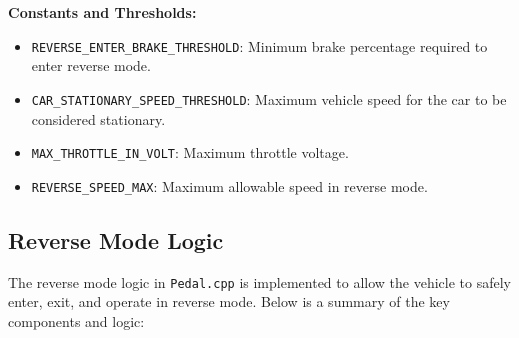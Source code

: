 \documentclass[a4paper,12pt]{article}
\begin{document}
\textbf{Constants and Thresholds:}
\begin{itemize}
    \item \texttt{REVERSE\_ENTER\_BRAKE\_THRESHOLD}: Minimum brake percentage required to enter reverse mode.
    \item \texttt{CAR\_STATIONARY\_SPEED\_THRESHOLD}: Maximum vehicle speed for the car to be considered stationary.
    \item \texttt{MAX\_THROTTLE\_IN\_VOLT}: Maximum throttle voltage.
    \item \texttt{REVERSE\_SPEED\_MAX}: Maximum allowable speed in reverse mode.
\end{itemize}

\subsection{Reverse Mode Logic}
The reverse mode logic in \texttt{Pedal.cpp} is implemented to allow the vehicle to safely enter, exit, and operate in reverse mode. Below is a summary of the key components and logic:
\end{document}
